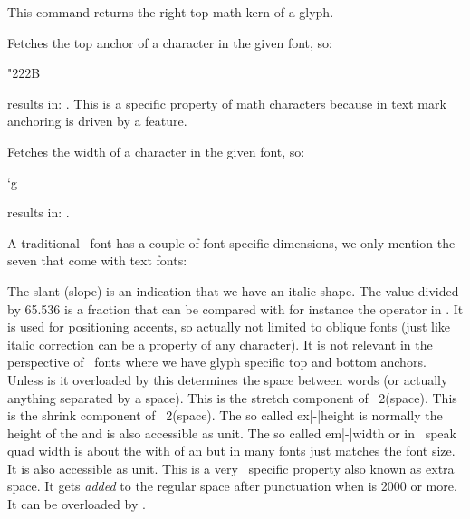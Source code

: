 \stopnewprimitive

\startnewprimitive[title={\prm {fontcharrt}}]

This command returns the right-top math kern of a glyph.

\stopnewprimitive

\startnewprimitive[title={\prm {fontcharta}}]

Fetches the top anchor of a character in the given font, so:

\startbuffer
\the\fontcharba{} "222B
\stopbuffer

results in: \inlinebuffer. This is a specific property of math characters because
in text mark anchoring is driven by a feature.

\stopnewprimitive

\startoldprimitive[title={\prm {fontcharwd}}]

Fetches the width of a character in the given font, so:

\startbuffer
\the\fontcharwd\font`g
\stopbuffer

results in: \inlinebuffer.

\stopoldprimitive

\startoldprimitive[title={\prm {fontdimen}}][obsolete=yes]

A traditional \TEX\ font has a couple of font specific dimensions, we only
mention the seven that come with text fonts:

\startitemize[n,packed]
\startitem
    The slant (slope) is an indication that we have an italic shape. The value
    divided by 65.536 is a fraction that can be compared with for instance the
     operator in \METAPOST. It is used for positioning accents, so
    actually not limited to oblique fonts (just like italic correction can be a
    property of any character). It is not relevant in the perspective of
    \OPENTYPE\ fonts where we have glyph specific top and bottom anchors.
\stopitem
\startitem
    Unless is it overloaded by  this determines the space between
    words (or actually anything separated by a space).
\stopitem
\startitem
    This is the stretch component of ~2(space).
\startitem
    This is the shrink component of ~2(space).
\stopitem
\startitem
    The so called ex|-|height is normally the height of the  and is
    also accessible as  unit.
\stopitem
\startitem
    The so called em|-|width or in \TEX\ speak quad width is about the with of an
     but in many fonts just matches the font size. It is also
    accessible as  unit.
\stopitem
\startitem
    This is a very \TEX\ specific property also known as extra space. It gets
    {\em added} to the regular space after punctuation when  is
    2000 or more. It can be overloaded by .
\stopitem
\stopitemize

